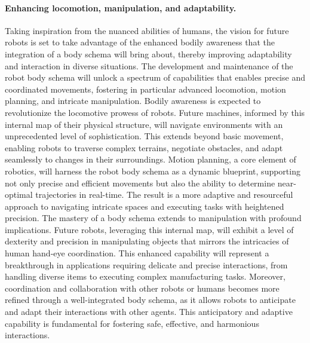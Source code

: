 \paragraph*{Enhancing locomotion, manipulation, and adaptability.} Taking inspiration from the nuanced abilities of humans, the vision for future robots is set to take advantage of the enhanced bodily awareness that the integration of a body schema will bring about, thereby improving adaptability and interaction in diverse situations. The development and maintenance of the robot body schema will unlock a spectrum of capabilities that enables precise and coordinated movements, fostering in particular advanced locomotion, motion planning, and intricate manipulation. Bodily awareness is expected to revolutionize the locomotive prowess of robots. Future machines, informed by this internal map of their physical structure, will navigate environments with an unprecedented level of sophistication. This extends beyond basic movement, enabling robots to traverse complex terrains, negotiate obstacles, and adapt seamlessly to changes in their surroundings. Motion planning, a core element of robotics, will harness the robot body schema as a dynamic blueprint, supporting not only precise and efficient movements but also the ability to determine near-optimal trajectories in real-time. The result is a more adaptive and resourceful approach to navigating intricate spaces and executing tasks with heightened precision. The mastery of a body schema extends to manipulation with profound implications. Future robots, leveraging this internal map, will exhibit a level of dexterity and precision in manipulating objects that mirrors the intricacies of human hand-eye coordination. This enhanced capability will represent a breakthrough in applications requiring delicate and precise interactions, from handling diverse items to executing complex manufacturing tasks. Moreover, coordination and collaboration with other robots or humans becomes more refined through a well-integrated body schema, as it allows robots to anticipate and adapt their interactions with other agents. This anticipatory and adaptive capability is fundamental for fostering safe, effective, and harmonious interactions.

